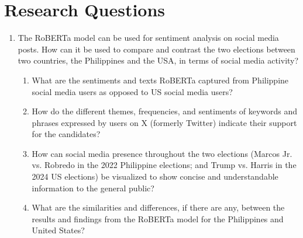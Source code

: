 \section{Research Questions}

\begin{enumerate}
    \item The RoBERTa model can be used for sentiment analysis on social media posts. How can it be used to compare and contrast the two elections between two countries, the Philippines and the USA, in terms of social media activity?
    \begin{enumerate}
        \item What are the sentiments and texts RoBERTa captured from Philippine social media users as opposed to US social media users?
        \item How do the different themes, frequencies, and sentiments of keywords and phrases expressed by users on X (formerly Twitter) indicate their support for the candidates?
        \item How can social media presence throughout the two elections (Marcos Jr. vs. Robredo in the 2022 Philippine elections; and Trump vs. Harris in the 2024 US elections) be visualized to show concise and understandable information to the general public?
        \item What are the similarities and differences, if there are any, between the results and findings from the RoBERTa model for the Philippines and United States?
    \end{enumerate}
\end{enumerate}